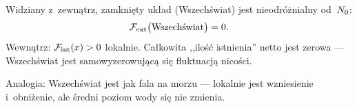 \begin{axiom}\label{ax:zero}
Widziany z~zewn\k{a}trz, zamkni\k{e}ty uk\l{}ad (Wszech\'swiat) jest
nieodr\'o\.znialny od~$N_0$:
\begin{equation}\label{eq:zero-sum}
    \mathcal{F}_{\mathrm{ext}}\bigl(\text{Wszech\'swiat}\bigr) = 0.
\end{equation}
Wewn\k{a}trz: $\mathcal{F}_{\mathrm{int}}(x) > 0$ lokalnie. Ca\l{}kowita
,,ilo\'s\'c istnienia'' netto jest zerowa --- Wszech\'swiat jest
samowyzerowuj\k{a}c\k{a} si\k{e} fluktuacj\k{a} nico\'sci.
\end{axiom}

%
%
%

Analogia: Wszech\'swiat jest jak fala na morzu --- lokalnie jest
wzniesienie i~obni\.zenie, ale \'sredni poziom wody si\k{e} nie zmienia.

